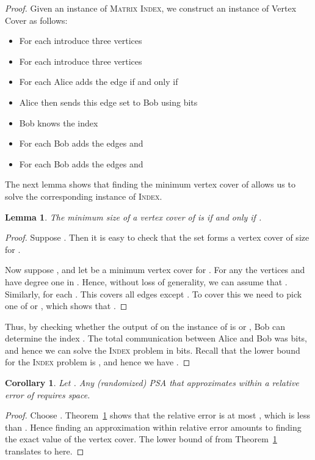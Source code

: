\documentclass[11pt,letter]{article}
\newtheorem{corollary}[theorem]{Corollary}
\newtheorem{lemma}[theorem]{Lemma}
\begin{document}
\begin{proof}
{Given an instance  of \textsc{Matrix Index},
we construct an instance  of Vertex Cover as follows:
\begin{itemize}
\item For each  introduce three vertices 
\item For each  introduce three vertices 
\item For each  Alice adds the edge  if and only if 
\item Alice then sends this edge set to Bob using  bits
\item Bob knows the index 
\item For each  Bob adds the edges  and 
\item For each  Bob adds the edges  and 
\end{itemize}
}

The next lemma shows that finding the minimum vertex cover of 
allows us to solve the corresponding instance of \textsc{Index}.


\begin{lemma}
The minimum size of a vertex cover of  is  if and only if
.
\label{thm:lower-bound-vc-insertion}
\end{lemma}
\begin{proof}
Suppose .
Then it is easy to check that the set 
forms a vertex cover of size  for .

Now suppose
,
and let  be a minimum vertex cover for .
For any  the vertices  and  have degree one in .
Hence, without loss of generality, we can assume that .
Similarly,  for each .
This covers all edges except .
To cover this we need to pick one of  or ,
which shows that .
\end{proof}
Thus, by checking whether the output of  on the instance
 of  is  or , Bob can determine the index
.
The total communication between Alice and Bob was  bits,
and hence we can solve the \textsc{Index} problem in  bits. Recall that the
lower bound for the \textsc{Index} problem is , and hence we have .
\end{proof}

\begin{corollary}
Let . Any (randomized) PSA that approximates  within a relative error of
 requires  space.
\end{corollary}

\begin{proof}
Choose . Theorem~\ref{thm:lower-bound-vc-insertion}
shows that the relative error is at most , which is less than .
Hence finding an approximation within  relative error amounts to
finding the exact value of the vertex cover. The lower bound of 
from Theorem~\ref{thm:lower-bound-vc-insertion} translates to  here.
\end{proof}
\end{document}
